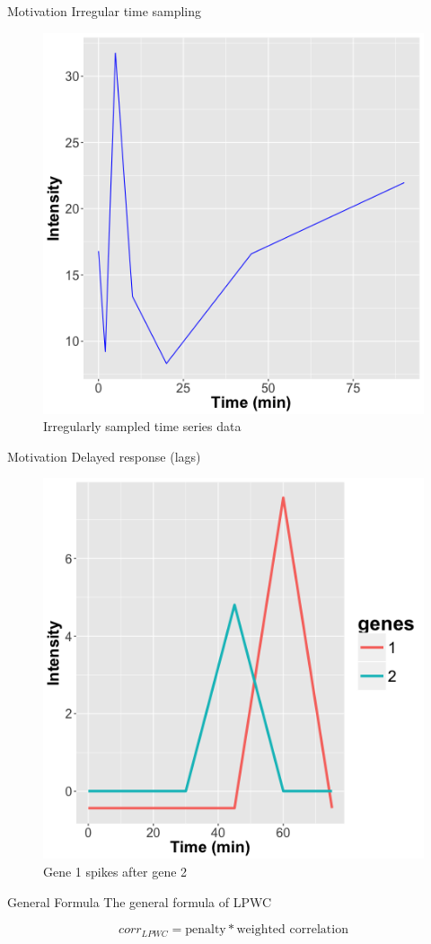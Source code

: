 \documentclass[10pt]{beamer}
\begin{document}
\begin{frame}{Motivation}
Irregular time sampling

\begin{figure}
     \includegraphics[width=0.6\linewidth]{sample.png}
      \caption{Irregularly sampled time series data}
       \label{fig:irregular}
    \end{figure}

\end{frame}


\begin{frame}{Motivation}
Delayed response (lags)

\begin{figure}
     \includegraphics[width=0.5\linewidth]{delay.png}
      \caption{Gene 1 spikes after gene 2}
       \label{fig:irregular}
    \end{figure}

\end{frame}


\begin{frame}{General Formula}
The general formula of LPWC 

$$corr_{LPWC} = \text{penalty} * \text{weighted correlation}$$

\end{frame}
\end{document}
